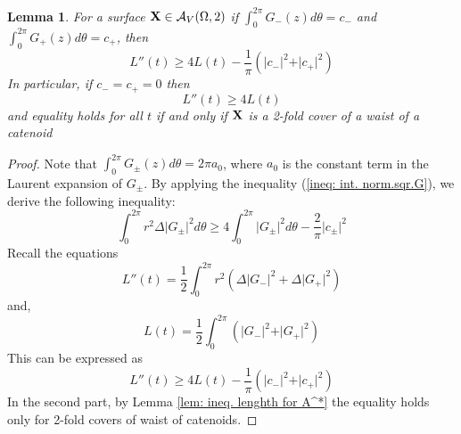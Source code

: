 \documentclass[11pt]{amsart}
\newtheorem{lem}[thm]{Lemma}
\numberwithin{equation}{section}
\theoremstyle{theorem}
\theoremstyle{definition}
\numberwithin{equation}{section}
\begin{document}
\begin{lem}
    For a surface $\bold{X} \in \mathcal{A}_V(\Omega ,2)$ if $\int_0^{2\pi} G_-(z)d\theta = c_- $ and $ \int_0^{2\pi} G_+(z)d\theta = c_+$, then  
    $$
    L''(t) \geq 4L(t) -  \frac{1}{\pi}(\vert c_-\vert^2 +\vert c_+\vert^2 )
    $$
    In particular, if $c_-=c_+=0$ then
    $$
    L''(t) \geq 4L(t)
    $$
    and equality holds for all $t$ if and only if $\bold{X}$ is a 2-fold cover of a waist of a catenoid
\end{lem}
\begin{proof}
    Note that $\int_0^{2\pi} G_{\pm}(z) d\theta =2\pi a_0$, where $a_0$ is the constant term in the Laurent expansion of $G_{\pm}$. By applying the inequality (\ref{ineq: int. norm.sqr.G}), we derive the following inequality:
    $$
     \int_{0}^{2\pi} r^2 \Delta \vert G_{\pm} \vert^2 d\theta \geq 4 \int_{0}^{2\pi} \vert G_{\pm} \vert^2 d\theta - \frac{2}{\pi} \vert c_{\pm} \vert^2 
    $$  
    Recall the equations
    $$
    L''(t)=\frac{1}{2}\int_0^{2\pi}r^2 (\Delta \vert G_-\vert^2 + \Delta \vert G_+\vert^2)
    $$
    and,
    $$
    L(t) = \frac{1}{2}\int_0^{2\pi} ( \vert G_-\vert^2 +  \vert G_+\vert^2)
    $$
    This can be expressed as
    $$
    L''(t) \geq 4L(t) - \frac{1}{\pi}(\vert c_-\vert^2 +\vert c_+\vert^2 )
    $$
    In the second part, by Lemma \ref{lem: ineq. lenghth for A^*} the equality holds only for 2-fold covers of waist of catenoids.
\end{proof}
\end{document}
